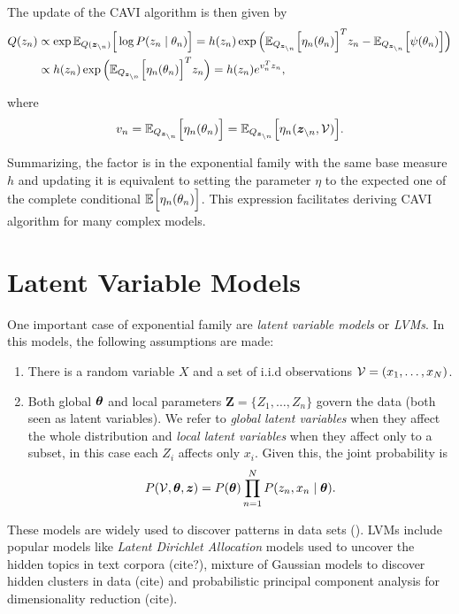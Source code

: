 The update of the CAVI algorithm  is then given by
  \begin{align}
    Q(z_{n}) &\propto \exp{\mathbb{E}_{Q(\bm{z}_{\backslash n})}\Big[\log P(z_{n} \mid \theta_{n})\Big]} = h(z_{n})\exp \Big(\mathbb{E}_{Q_{\bm{z}_{\backslash n}}}\Big[ {\eta_{n}(\theta_{n})}\Big]^{T}z_{n} - \mathbb{E}_{Q_{\bm{z}_{\backslash n}}}\Big[ \psi(\theta_{n})\Big]\Big) \nonumber \\
    &\propto  h(z_{n})\exp \Big(\mathbb{E}_{Q_{\bm{z}_{\backslash n}}}\Big[ {\eta_{n}(\theta_{n})}\Big]^{T}z_{n}\Big) = h(z_{n})e^{v_{n}^{T}z_{n} }, \label{eq:exponential_update}
  \end{align}

where
\[
  v_{n} = \mathbb{E}_{Q_{\bm{z}_{\backslash n}}}\Big[\eta_{n}(\theta_{n})\Big] =  \mathbb{E}_{Q_{\bm{z}_{\backslash n}}}\Big[\eta_{n}(\bm{z}_{\backslash n}, \mathcal{V})\Big].
\]

Summarizing, the factor is in the exponential family with the same base measure \(h\) and updating it is equivalent to setting the parameter \(\eta\) to the expected one of the complete conditional \(\mathbb{E}_{}\Big[\eta_{n}(\theta_{n})\Big]\). This expression facilitates deriving CAVI algorithm for many complex models.

\section{Latent Variable Models}

One important case of exponential family are \emph{latent variable models} or \emph{LVMs}. In this models, the following assumptions are made:
\begin{enumerate}\itemsep0.5em
  \item There is a random variable \(X\) and a set of i.i.d observations \(\mathcal{V} = (x_{1}, \dots, x_{N})\).
  \item Both global \(\bm{\theta}\) and local parameters \(\bm{Z} = \{Z_{1}, \dots, Z_{n}\}\) govern the data (both seen as latent variables). We refer to \emph{global latent variables} when they affect the whole distribution and \emph{local latent variables} when they affect only to a subset, in this case each \(Z_{i}\) affects only \(x_{i}\). Given this, the joint probability is
    \[
    P(\mathcal{V}, \bm{\theta}, \bm{z}) = P(\bm{\theta})\prod_{n=1}^{N}P(z_{n}, x_{n} \mid \bm{\theta}).
    \]

\end{enumerate}

\begin{remark}
  These models are widely used to discover patterns in data sets (\cite{blei2014build}).
  LVMs include popular models like \emph{Latent Dirichlet Allocation} models used to uncover the hidden topics in text corpora (cite?), mixture of Gaussian models to discover hidden clusters in data (cite) and probabilistic principal component analysis for dimensionality reduction (cite).
\end{remark}

